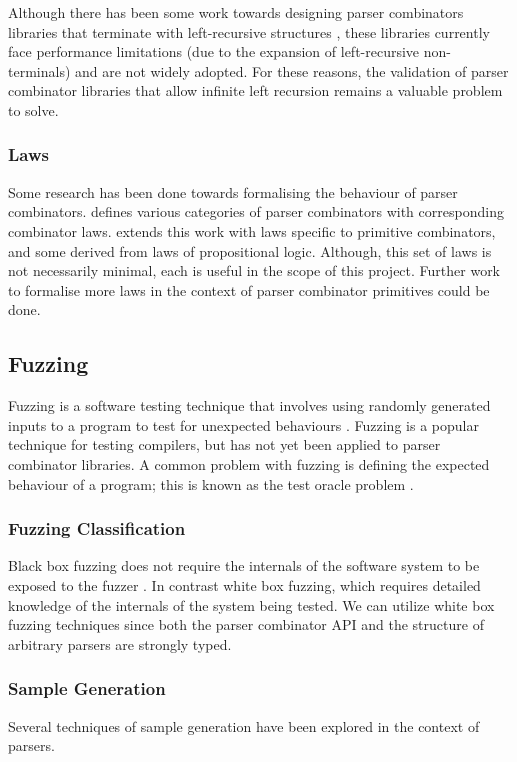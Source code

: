 \documentclass[11pt]{article}
\let\oldciteauthor\citeauthor
\renewcommand{\citeauthor}[1]{\oldciteauthor{#1} \cite{#1}}
\begin{document}
Although there has been some work towards designing parser combinators libraries that terminate with left-recursive structures \cite{left-recursive-detect}, these libraries currently face performance limitations (due to the expansion of left-recursive non-terminals) and are not widely adopted. For these reasons, the validation of parser combinator libraries that allow infinite left recursion remains a valuable problem to solve.

\subsubsection{Laws}

Some research has been done towards formalising the behaviour of parser combinators. \citeauthor{parsley} defines various categories of parser combinators with corresponding combinator laws. \citeauthor{staged-selective} extends this work with laws specific to primitive combinators, and some derived from laws of propositional logic. Although, this set of laws is not necessarily minimal, each is useful in the scope of this project. Further work to formalise more laws in the context of parser combinator primitives could be done.

\subsection{Fuzzing}
Fuzzing is a software testing technique that involves using randomly generated inputs to a program to test for unexpected behaviours \cite{fuzzing-importance}. Fuzzing is a popular technique for testing compilers, but has not yet been applied to parser combinator libraries. A common problem with fuzzing is defining the expected behaviour of a program; this is known as the test oracle problem \cite{fuzzing}.

\subsubsection{Fuzzing Classification}
Black box fuzzing does not require the internals of the software system to be exposed to the fuzzer \cite{fuzzing}. In contrast white box fuzzing, which requires detailed knowledge of the internals of the system being tested. We can utilize white box fuzzing techniques since both the parser combinator API and the structure of arbitrary parsers are strongly typed.

\subsubsection{Sample Generation}
Several techniques of sample generation have been explored in the context of parsers. 
\end{document}
